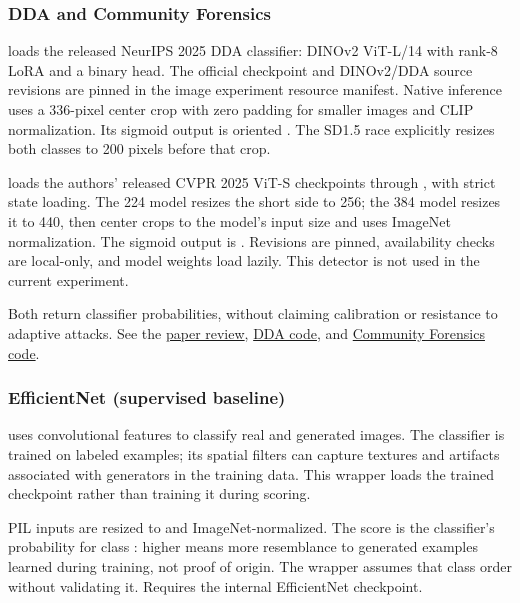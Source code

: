 \subsubsection{DDA and Community
Forensics}\label{record-DETECTORS-md-dda-and-community-forensics}

\texttt{} loads the released NeurIPS 2025 DDA
classifier: DINOv2 ViT-L/14 with rank-8 LoRA and a binary head. The
official checkpoint and DINOv2/DDA source revisions are pinned in the
image experiment resource manifest. Native inference uses a 336-pixel
center crop with zero padding for smaller images and CLIP normalization.
Its sigmoid output is oriented \texttt{}. The SD1.5
race explicitly resizes both classes to 200 pixels before that crop.

\texttt{} loads the authors'
released CVPR 2025 ViT-S checkpoints through \texttt{},
with strict state loading. The 224 model resizes the short side to 256;
the 384 model resizes it to 440, then center crops to the model's input
size and uses ImageNet normalization. The sigmoid output is
\texttt{}. Revisions are pinned, availability checks
are local-only, and model weights load lazily. This detector is not used
in the current experiment.

Both return classifier probabilities, without claiming calibration or
resistance to adaptive attacks. See the
\href{records/docs/image_defenders.tex}{paper review},
\href{https://github.com/roy-ch/Dual-Data-Alignment}{DDA code}, and
\href{https://github.com/JeongsooP/Community-Forensics}{Community
Forensics code}.

\subsubsection{EfficientNet (supervised
baseline)}\label{record-DETECTORS-md-efficientnet-supervised-baseline}

\texttt{} uses convolutional features to
classify real and generated images. The classifier is trained on labeled
examples; its spatial filters can capture textures and artifacts
associated with generators in the training data. This wrapper loads the
trained checkpoint rather than training it during scoring.

PIL inputs are resized to \texttt{} and
ImageNet-normalized. The score is the classifier's probability for class
\texttt{}: higher means more resemblance to generated
examples learned during training, not proof of origin. The wrapper
assumes that class order without validating it. Requires the internal
\texttt{} EfficientNet checkpoint.

